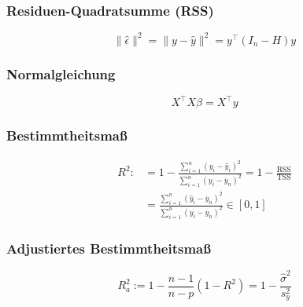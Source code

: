 \subsubsection*{Residuen-Quadratsumme (RSS)}

\[ \|\hat\epsilon\|^2 = \|y - \hat y\|^2 = y^\top (I_n-H) y \]

\subsubsection*{Normalgleichung}

\[ X^\top X \beta = X^\top y \]

\subsubsection*{Bestimmtheitsmaß}

\vspace*{-3mm}
\begin{align*}
R^2 :&= 1 - \frac{\sum_{i=1}^n (y_i - \hat y_i)^2}{\sum_{i=1}^n (y_i - \overline y_n)^2} = 1 - \frac{\text{RSS}}{\text{TSS}} \\
&= \frac{\sum_{i=1}^n (\hat y_i - \overline y_n)^2}{\sum_{i=1}^n (y_i - \overline y_n)^2} \in [0,1]
\end{align*}

\subsubsection*{Adjustiertes Bestimmtheitsmaß}

\[ R_a^2 := 1 - \frac{n-1}{n-p} (1-R^2) = 1 - \frac{\hat\sigma^2}{s_y^2} \]
